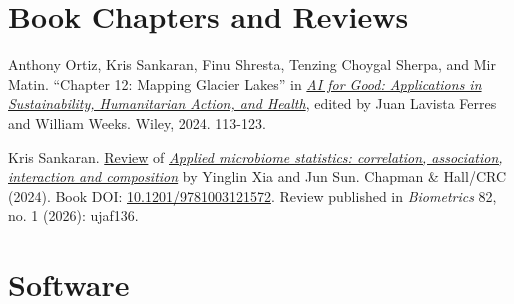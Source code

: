 \documentclass[letterpaper]{article}
\renewenvironment{itemize}{
  \begin{list}{}{
    \setlength{\leftmargin}{1.5em}
  }
}{
  \end{list}
}
\begin{document}
\section*{Book Chapters and Reviews}
\begin{itemize}
\item Anthony Ortiz, Kris Sankaran, Finu Shresta, Tenzing Choygal Sherpa, and
Mir Matin. “Chapter 12: Mapping Glacier Lakes” in \href{https://www.wiley.com/en-us/AI+for+Good%3A+Applications+in+Sustainability%2C+Humanitarian+Action%2C+and+Health-p-9781394235889}{\textit{AI for Good: Applications in
Sustainability, Humanitarian Action, and Health}}, edited by Juan Lavista Ferres
and William Weeks. Wiley, 2024. 113-123.
\item Kris Sankaran. \href{https://doi.org/10.1093/biomtc/ujaf136}{Review} of
\href{https://doi.org/10.1201/9781003121572}{\textit{Applied microbiome
statistics: correlation, association, interaction and composition}} by Yinglin
Xia and Jun Sun. Chapman \& Hall/CRC (2024). Book DOI:
\href{https://doi.org/10.1201/9781003121572}{10.1201/9781003121572}. Review
published in \textit{Biometrics} 82, no. 1 (2026): ujaf136.
\end{itemize}

\section*{Software}
\end{document}
